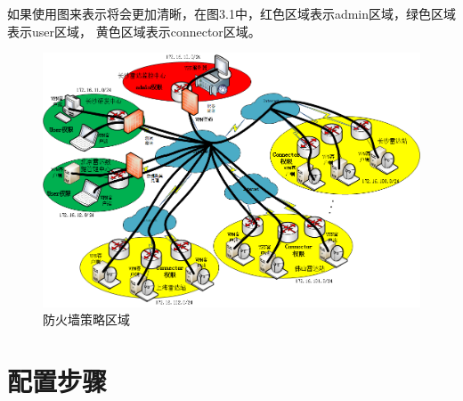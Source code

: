 \documentclass[a4paper,12pt]{report}
\begin{document}
如果使用图来表示将会更加清晰，在图3.1中，红色区域表示admin区域，绿色区域表示user区域，
黄色区域表示connector区域。

\begin{figure}[hbtp]
	\centering
	\includegraphics [width=1.0\textwidth]{figure//RadarPrivilege.png}
	\caption{防火墙策略区域}\label{RadarPrivilege}
\end{figure}
\chapter{配置步骤}
\end{document}
